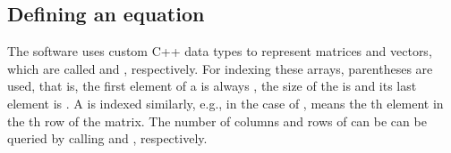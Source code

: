 \documentclass[10pt,a4paper]{ddedoc}
\begin{document}
% 

\subsection{Defining an equation}

The software uses custom C++ data types to represent matrices and vectors,
which are called  and , respectively. For indexing
these arrays, parentheses are used, that is, the first element of a
  is always , the size of the  is
 and its last
element is . A  is indexed similarly, e.g., in
the case of ,  means the th element in the
th row of the matrix. The number of columns and rows of  can
be can be queried by calling  and , respectively.
\end{document}
